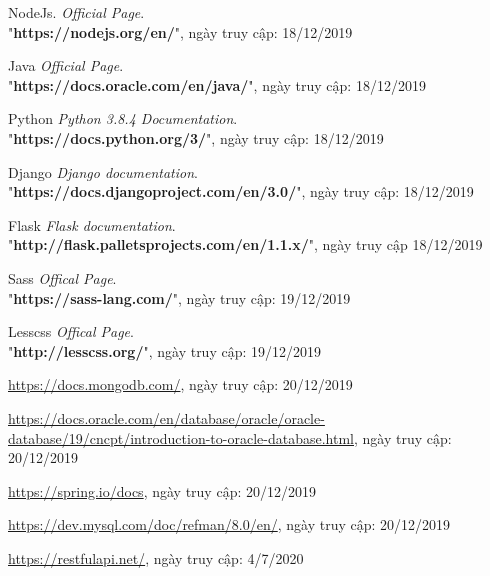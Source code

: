 \newpage
\begin{thebibliography}{80}

\bibitem{}
NodeJs. \textit{Official Page}.\\
"\textbf{https://nodejs.org/en/}", ngày truy cập: 18/12/2019

\bibitem{}
Java \textit{Official Page}.\\
"\textbf{https://docs.oracle.com/en/java/}", ngày truy cập: 18/12/2019

\bibitem{}
Python \textit{Python 3.8.4 Documentation}.\\
"\textbf{https://docs.python.org/3/}", ngày truy cập: 18/12/2019

\bibitem{}
Django \textit{Django documentation}.\\
"\textbf{https://docs.djangoproject.com/en/3.0/}", ngày truy cập: 18/12/2019

\bibitem{}
Flask \textit{Flask documentation}.\\
"\textbf{http://flask.palletsprojects.com/en/1.1.x/}", ngày truy cập 18/12/2019


\bibitem{}
Sass \textit{Offical Page}.\\
"\textbf{https://sass-lang.com/}", ngày truy cập: 19/12/2019

\bibitem{}
Lesscss \textit{Offical Page}.\\
"\textbf{http://lesscss.org/}", ngày truy cập: 19/12/2019

\bibitem{}
\url{https://docs.mongodb.com/}, ngày truy cập: 20/12/2019

\bibitem{}
\url{https://docs.oracle.com/en/database/oracle/oracle-database/19/cncpt/introduction-to-oracle-database.html}, ngày truy cập: 20/12/2019

\bibitem{}
\url{https://spring.io/docs}, ngày truy cập: 20/12/2019

\bibitem{}
\url{https://dev.mysql.com/doc/refman/8.0/en/}, ngày truy cập: 20/12/2019

\bibitem{}
\url{https://restfulapi.net/}, ngày truy cập: 4/7/2020

\end{thebibliography}
